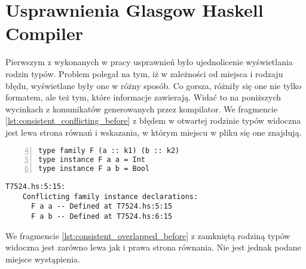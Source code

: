 \chapter{Usprawnienia Glasgow Haskell Compiler}\label{chap:badania}

\label{sec:zgloszenie_10839}

Pierwszym z wykonanych w pracy usprawnień było ujednolicenie wyświetlania rodzin
typów. Problem polegał na tym, iż w zależności od miejsca i rodzaju błędu,
wyświetlane były one w różny sposób. Co gorsza, różniły się one nie tylko
formatem, ale też tym, które informacje zawierają. Widać to na poniższych
wycinkach z komunikatów generowanych przez kompilator. We fragmencie
\ref{lst:consistent_conflicting_before} z błędem w otwartej rodzinie typów
widoczna jest lewa strona równań i wskazania, w którym miejscu w pliku się one
znajdują.

\begin{lstlisting}[float,numbers=left,firstnumber=4,label={lst:consistent_conflicting_code},
                   caption={Fragment testu T7524 z dwoma równaniami otwartej rodziny typów będącymi w konflikcie.}]
type family F (a :: k1) (b :: k2)
type instance F a a = Int
type instance F a b = Bool
\end{lstlisting}

\begin{lstlisting}[float,language={},label={lst:consistent_conflicting_before},
                   caption={Błąd generowany przez kompilator w przypadku \ref{lst:consistent_conflicting_code} przed wprowadzeniem zmian.}]
T7524.hs:5:15:
    Conflicting family instance declarations:
      F a a -- Defined at T7524.hs:5:15
      F a b -- Defined at T7524.hs:6:15
\end{lstlisting}

We fragmencie \ref{lst:consistent_overlapped_before} z zamkniętą rodziną typów widoczna jest zarówno lewa jak i prawa strona równania. Nie jest jednak podane miejsce wystąpienia.

